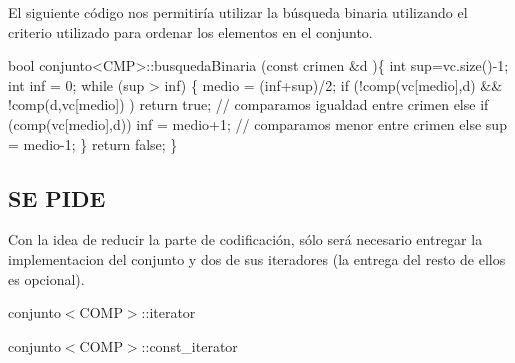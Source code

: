 El siguiente código nos permitiría utilizar la búsqueda binaria utilizando el criterio utilizado para ordenar los elementos en el conjunto. 
\begin{DoxyCode}
\textcolor{keywordtype}{bool} conjunto<CMP>::busquedaBinaria (\textcolor{keyword}{const} crimen &d )\{
    \textcolor{keywordtype}{int} sup=vc.size()-1;
    \textcolor{keywordtype}{int} inf = 0;
    \textcolor{keywordflow}{while} (sup > inf) \{
      medio = (inf+sup)/2;
      \textcolor{keywordflow}{if} (!comp(vc[medio],d) && !comp(d,vc[medio]) ) \textcolor{keywordflow}{return} \textcolor{keyword}{true};  \textcolor{comment}{// comparamos igualdad entre crimen}
      \textcolor{keywordflow}{else} \textcolor{keywordflow}{if} (comp(vc[medio],d)) inf = medio+1; \textcolor{comment}{// comparamos menor entre crimen}
      \textcolor{keywordflow}{else} sup = medio-1;
    \}
    \textcolor{keywordflow}{return} \textcolor{keyword}{false};
\}
\end{DoxyCode}
\hypertarget{index_SP2}{}\subsection{S\+E P\+I\+D\+E}\label{index_SP2}
Con la idea de reducir la parte de codificación, sólo será necesario entregar la implementacion del conjunto y dos de sus iteradores (la entrega del resto de ellos es opcional). \begin{DoxyItemize}
\item conjunto$<$\+C\+O\+M\+P$>$\+::iterator \item conjunto$<$\+C\+O\+M\+P$>$\+::const\+\_\+iterator\end{DoxyItemize}
